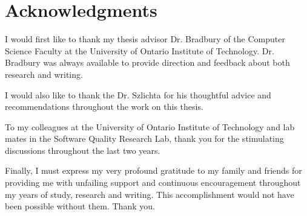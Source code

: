 \chapter*{Acknowledgments}

I would first like to thank my thesis advisor Dr. Bradbury of the Computer Science Faculty at the University of Ontario Institute of Technology. Dr. Bradbury was always available to provide direction and feedback about both research and writing.

I would also like to thank the Dr. Szlichta for his thoughtful advice and recommendations throughout the work on this thesis.

To my colleagues at the University of Ontario Institute of Technology and lab mates in the Software Quality Research Lab, thank you for the stimulating discussions throughout the last two years.

Finally, I must express my very profound gratitude to my family and friends for providing me with unfailing support and continuous encouragement throughout my years of study, research and writing. This accomplishment would not have been possible without them. Thank you.